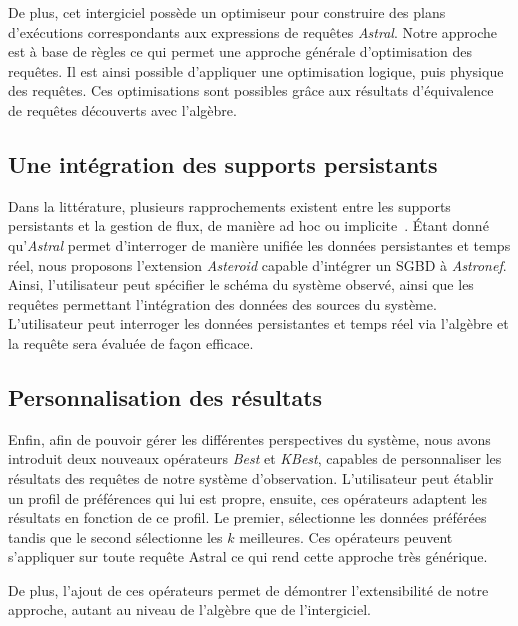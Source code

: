 De plus, cet intergiciel possède un optimiseur pour construire des plans d'exécutions correspondants aux expressions de requêtes \textit{Astral}. Notre approche est à base de règles ce qui permet une approche générale d'optimisation des requêtes. Il est ainsi possible d'appliquer une optimisation logique, puis physique des requêtes. Ces optimisations sont possibles grâce aux résultats d'équivalence de requêtes découverts avec l'algèbre.

\subsection{Une intégration des supports persistants}
Dans la littérature, plusieurs rapprochements existent entre les supports persistants et la gestion de flux, de manière ad hoc ou implicite~\cite{Balazinska:moirae,Reiss:fastbit}. Étant donné qu'\textit{Astral} permet d'interroger de manière unifiée les données persistantes et temps réel, nous proposons l'extension \textit{Asteroid} capable d'intégrer un SGBD à \textit{Astronef}. Ainsi, l'utilisateur peut spécifier le schéma du système observé, ainsi que les requêtes permettant l'intégration des données des sources du système. L'utilisateur peut interroger les données persistantes et temps réel via l'algèbre et la requête sera évaluée de façon efficace.

\subsection{Personnalisation des résultats}
Enfin, afin de pouvoir gérer les différentes perspectives du système, nous avons introduit deux nouveaux opérateurs \textit{Best} et \textit{KBest}, capables de personnaliser les résultats des requêtes de notre système d'observation. L'utilisateur peut établir un profil de préférences qui lui est propre, ensuite, ces opérateurs adaptent les résultats en fonction de ce profil. Le premier, sélectionne les données préférées tandis que le second sélectionne les $k$ meilleures. Ces opérateurs peuvent s'appliquer sur toute requête Astral ce qui rend cette approche très générique.

De plus, l'ajout de ces opérateurs permet de démontrer l'extensibilité de notre approche, autant au niveau de l'algèbre que de l'intergiciel.
